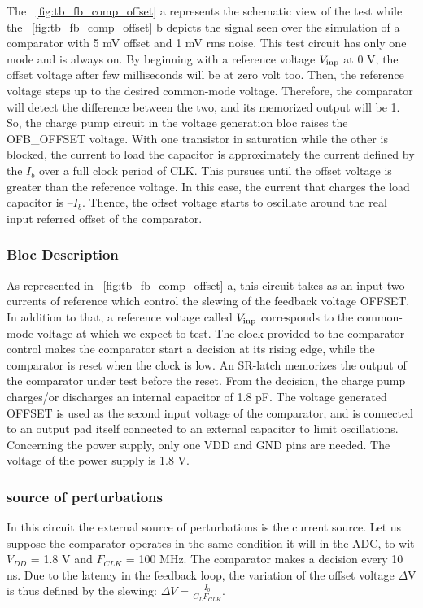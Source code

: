 The \figurename~\ref{fig:tb_fb_comp_offset} a represents the schematic view of the test while the \figurename~\ref{fig:tb_fb_comp_offset} b depicts the signal seen over the simulation of a comparator with 5 mV offset and 1 mV rms noise. This test circuit has only one mode and is always on. By beginning with a reference voltage $V_{\rm inp}$ at 0 V, the offset voltage after few milliseconds will be at zero volt too. Then, the reference voltage steps up to the desired common-mode voltage. Therefore, the comparator will detect the difference between the two, and its memorized output will be 1. So, the charge pump circuit in the voltage generation bloc raises the OFB\_OFFSET voltage. With one transistor in saturation while the other is blocked, the current to load the capacitor is approximately the current defined by the $I_b$ over a full clock period of CLK. This pursues until the offset voltage is greater than the reference voltage. In this case, the current that charges the load capacitor is $–I_b$. Thence, the offset voltage starts to oscillate around the real input referred offset of the comparator.

\subsubsection{Bloc Description}
As represented in \figurename~\ref{fig:tb_fb_comp_offset} a, this circuit takes as an input two currents of reference which control the slewing of the feedback voltage OFFSET\@. In addition to that, a reference voltage called $V_{\rm inp}$ corresponds to the common-mode voltage at which we expect to test. The clock provided to the comparator control makes the comparator start a decision at its rising edge, while the comparator is reset when the clock is low. An SR-latch memorizes the output of the comparator under test before the reset. From the decision, the charge pump charges/or discharges an internal capacitor of 1.8 pF. The voltage generated OFFSET is used as the second input voltage of the comparator, and is connected to an output pad itself connected to an external capacitor to limit oscillations. Concerning the power supply, only one VDD and GND pins are needed. The voltage of the power supply is 1.8 V.

\subsubsection{source of perturbations}
In this circuit the external source of perturbations is the current source. Let us suppose the comparator operates in the same condition it will in the ADC\@, to wit $V_{DD}$ = 1.8 V and $F_{CLK}$ = 100 MHz. The comparator makes a decision every 10 ns. Due to the latency in the feedback loop, the variation of the offset voltage $\Delta$V is thus defined by the slewing: $\Delta V = \frac{I_b}{C_L F_{CLK}}$.

